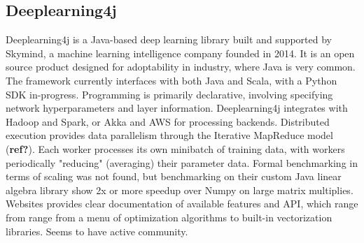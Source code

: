 \documentclass{article}
\begin{document}
\subsection{Deeplearning4j}
Deeplearning4j is a Java-based deep learning library built and supported by Skymind, a machine learning intelligence company founded in 2014. It is an open source product designed for adoptability in industry, where Java is very common. The framework currently interfaces with both Java and Scala, with a Python SDK in-progress. Programming is primarily declarative, involving specifying network hyperparameters and layer information. Deeplearning4j integrates with Hadoop and Spark, or Akka and AWS for processing backends. Distributed execution provides data parallelism through the Iterative MapReduce model (\textbf{ref?}). Each worker processes its own minibatch of training data, with workers periodically "reducing" (averaging) their parameter data. Formal benchmarking in terms of scaling was not found, but benchmarking on their custom Java linear algebra library show 2x or more speedup over Numpy on large matrix multiplies. Websites provides clear documentation of available features and API, which range from range from a menu of optimization algorithms to built-in vectorization libraries. Seems to have active community. 
\end{document}
